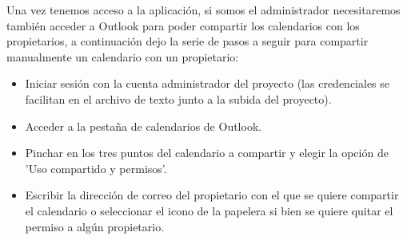 Una vez tenemos acceso a la aplicación, si somos el administrador necesitaremos también acceder a Outlook para poder compartir los calendarios con los propietarios, a continuación dejo la serie de pasos a seguir para compartir manualmente un calendario con un propietario:
\begin{itemize}
    \item Iniciar sesión con la cuenta administrador del proyecto (las credenciales se facilitan en el archivo de texto junto a la subida del proyecto).
    \item Acceder a la pestaña de calendarios de Outlook. \newline
    \item Pinchar en los tres puntos del calendario a compartir y elegir la opción de 'Uso compartido y permisos'.\newline
    \item Escribir la dirección de correo del propietario con el que se quiere compartir el calendario o seleccionar el icono de la papelera si bien se quiere quitar el permiso a algún propietario.\newline
\end{itemize}
